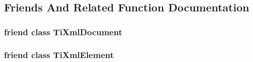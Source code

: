 \subsection{Friends And Related Function Documentation}
\hypertarget{class_ti_xml_node_a173617f6dfe902cf484ce5552b950475}{
\subsubsection[{Ti\-Xml\-Document}]{\setlength{\rightskip}{0pt plus 5cm}friend class {\bf Ti\-Xml\-Document}\hspace{0.3cm}{\ttfamily [friend]}}}\label{class_ti_xml_node_a173617f6dfe902cf484ce5552b950475}
\hypertarget{class_ti_xml_node_ab6592e32cb9132be517cc12a70564c4b}{
\subsubsection[{Ti\-Xml\-Element}]{\setlength{\rightskip}{0pt plus 5cm}friend class {\bf Ti\-Xml\-Element}\hspace{0.3cm}{\ttfamily [friend]}}}\label{class_ti_xml_node_ab6592e32cb9132be517cc12a70564c4b}


